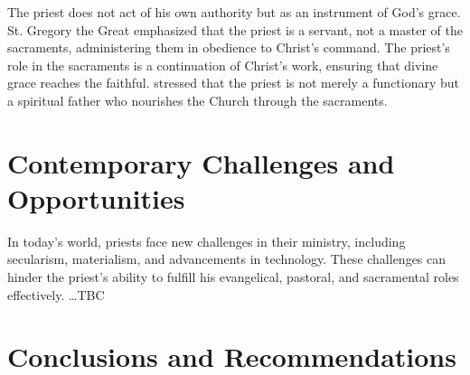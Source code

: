 \documentclass[12pt,doc]{apa7}   	%
\begin{document}
The priest does not act of his own authority but as an instrument of God’s grace. St. Gregory the Great \citep{early_church_akin} emphasized that the priest is a servant, not a master of the sacraments, administering them in obedience to Christ’s command.  The priest’s role in the sacraments is a continuation of Christ’s work, ensuring that divine grace reaches the faithful. \citet{priesthood_shenouda} stressed that the priest is not merely a functionary but a spiritual father who nourishes the Church through the sacraments.

\section{Contemporary Challenges and Opportunities}

In today’s world, priests face new challenges in their ministry, including secularism, materialism, and advancements in technology. These challenges can hinder the priest’s ability to fulfill his evangelical, pastoral, and sacramental roles effectively. \dots TBC

\clearpage
\section{Conclusions and Recommendations}
\end{document}
